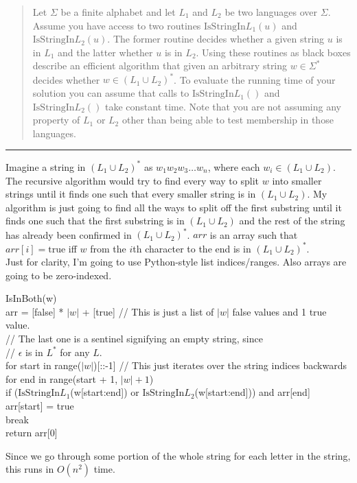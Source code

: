 \documentclass[11pt]{article}
\newcommand{\IsSinlang}[1]{\text{IsStringIn}L_{#1}}
\begin{document}

\begin{quote}
    Let $\Sigma$ be a finite alphabet and let $L_1$ and $L_2$ be two
  languages over $\Sigma$. Assume you have access to two routines
  $\IsSinlang{1}(u)$ and $\IsSinlang{2}(u)$. The former routine
  decides whether a given string $u$ is in $L_1$ and the latter
  whether $u$ is in $L_2$. Using these routines as black boxes
  describe an efficient algorithm that given an arbitrary string
  $w \in \Sigma^*$ decides whether $w \in (L_1 \cup L_2)^*$. To
  evaluate the running time of your solution you can assume that calls
  to $\IsSinlang{1}()$ and $\IsSinlang{2}()$ take constant time. Note
  that you are not assuming any property of $L_1$ or $L_2$ other than
  being able to test membership in those languages.
\end{quote}
\hrule



\begin{solution}
    Imagine a string in $(L_1\cup L_2)^*$ as $w_1w_2w_3\ldots w_n$, where each $w_i \in (L_1\cup L_2)$. The recursive algorithm would try to find every way to split $w$ into smaller strings until it finds one such that every smaller string is in $(L_1\cup L_2)$. My algorithm is just going to find all the ways to split off the first substring until it finds one such that the first substring is in $(L_1\cup L_2)$ and the rest of the string has already been confirmed in $(L_1\cup L_2)^*$. $arr$ is an array such that $arr[i] = \text{true}$ iff $w$ from the $i$th character to the end is in $(L_1\cup L_2)^*$.
    \\ Just for clarity, I'm going to use Python-style list indices/ranges. Also arrays are going to be zero-indexed. 
    \begin{algo}
        IsInBoth(w) \+
        \\ arr = [false] * $|w|$ + [true] // This is just a list of $|w|$ false values and 1 true value.
        \\ // The last one is a sentinel signifying an empty string, since 
        \\ // $\epsilon$ is in $L^*$ for any $L$.
        \\ for start in range($|w|$)[::-1] // This just iterates over the string indices backwards\+
        \\ for end in range(start + 1, $|w| + 1$) \+
        \\ if ($\IsSinlang{1}$(w[start:end]) or $\IsSinlang{2}$(w[start:end])) and arr[end] \+
        \\ arr[start] = true
        \\ break \- \- \-
        \\ return arr[0]
    \end{algo}
    Since we go through some portion of the whole string for each letter in the string, this runs in $O(n^2)$ time. 
\end{solution}
\end{document}
